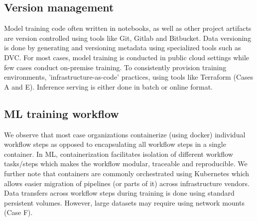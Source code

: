 






\subsection{Version management}
Model training code often written in notebooks, as well as other project artifacts are version controlled using tools like Git, Gitlab and Bitbucket. Data versioning is done by generating and versioning metadata using specialized tools such as DVC. %
For most cases, model training is conducted in public cloud settings while few cases conduct on-premise training. To consistently provision training environments, 'infrastructure-as-code' practices, using tools like Terraform (Cases A and E). Inference serving is either done in batch or online format.


\subsection{ML training workflow}
We observe that most case organizations containerize (using docker) individual workflow steps as opposed to encapsulating all workflow steps in a single container. %
In ML, containerization facilitates isolation of different workflow tasks/steps which makes the workflow modular, traceable and reproducible. We further note that containers are commonly orchestrated using Kubernetes which allows easier migration of pipelines (or parts of it) across infrastructure vendors. Data transfers across workflow steps during training is done using standard persistent volumes. However, large datasets may require using network mounts (Case F). %

